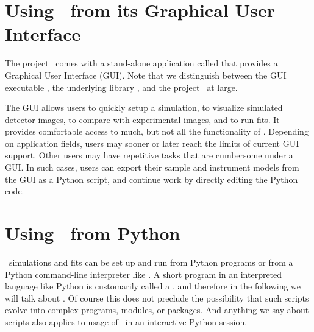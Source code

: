 \section{Using \BornAgain\ from its Graphical User Interface}

The project \BornAgain\ comes with a stand-alone application called 
that provides a Graphical User Interface (GUI).
Note that we distinguish between the GUI executable ,
the underlying library , and the project \BornAgain\ at large.

The GUI allows users to quickly setup a simulation, to visualize simulated
detector images, to compare with experimental images, and to run fits.
It provides comfortable access to much, but not all the functionality
of .
Depending on application fields,
users may sooner or later reach the limits of current GUI support.
Other users may have repetitive tasks that are cumbersome under a GUI.
In such cases, users can export their sample and instrument models from
the GUI as a Python script,
and continue work by directly editing the Python code.


\section{Using \BornAgain\ from Python}

\BornAgain\ simulations and fits can be set up and run from Python programs
or from a Python command-line interpreter like .
A short program in an interpreted language like Python is customarily called
a ,
and therefore in the following we will talk about .
Of course this does not preclude the possibility that such scripts evolve into
complex programs, modules, or packages.
And anything we say about scripts also applies to usage of \BornAgain\ in an
interactive Python session.%
%
%

